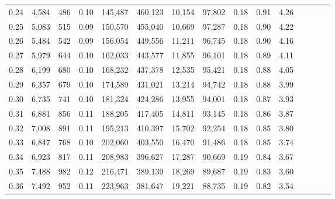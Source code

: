 \begin{tabular}{rrrcrrrrrrrrrrr}
0.24 &   4,584 &    486 &                                       0.10 &  145,487 &  460,123 &   10,154 &   97,802 &  0.18 &  0.91 &                         4.26 \\
0.25 &   5,083 &    515 &                                       0.09 &  150,570 &  455,040 &   10,669 &   97,287 &  0.18 &  0.90 &                         4.22 \\
0.26 &   5,484 &    542 &                                       0.09 &  156,054 &  449,556 &   11,211 &   96,745 &  0.18 &  0.90 &                         4.16 \\
0.27 &   5,979 &    644 &                                       0.10 &  162,033 &  443,577 &   11,855 &   96,101 &  0.18 &  0.89 &                         4.11 \\
0.28 &   6,199 &    680 &                                       0.10 &  168,232 &  437,378 &   12,535 &   95,421 &  0.18 &  0.88 &                         4.05 \\
0.29 &   6,357 &    679 &                                       0.10 &  174,589 &  431,021 &   13,214 &   94,742 &  0.18 &  0.88 &                         3.99 \\
0.30 &   6,735 &    741 &                                       0.10 &  181,324 &  424,286 &   13,955 &   94,001 &  0.18 &  0.87 &                         3.93 \\
0.31 &   6,881 &    856 &                                       0.11 &  188,205 &  417,405 &   14,811 &   93,145 &  0.18 &  0.86 &                         3.87 \\
0.32 &   7,008 &    891 &                                       0.11 &  195,213 &  410,397 &   15,702 &   92,254 &  0.18 &  0.85 &                         3.80 \\
0.33 &   6,847 &    768 &                                       0.10 &  202,060 &  403,550 &   16,470 &   91,486 &  0.18 &  0.85 &                         3.74 \\
0.34 &   6,923 &    817 &                                       0.11 &  208,983 &  396,627 &   17,287 &   90,669 &  0.19 &  0.84 &                         3.67 \\
0.35 &   7,488 &    982 &                                       0.12 &  216,471 &  389,139 &   18,269 &   89,687 &  0.19 &  0.83 &                         3.60 \\
0.36 &   7,492 &    952 &                                       0.11 &  223,963 &  381,647 &   19,221 &   88,735 &  0.19 &  0.82 &                         3.54 \\

\end{tabular}
